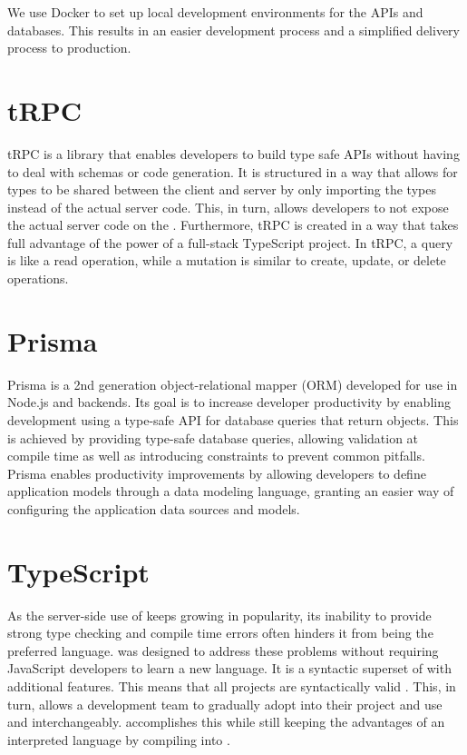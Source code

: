 We use Docker to set up local development environments for the APIs and databases. This results in an easier development process and a simplified delivery process to production.

\section{tRPC}
tRPC is a library that enables developers to build type safe APIs without having to deal with schemas or code generation.
It is structured in a way that allows for types to be shared between the client and server by only importing the types instead of the actual server code.
This, in turn, allows developers to not expose the actual server code on the \frontend{}.
Furthermore, tRPC is created in a way that takes full advantage of the power of a full-stack TypeScript project\cite{tRPC}.
In tRPC, a query is like a read operation, while a mutation is similar to create, update, or delete operations.

\section{Prisma}
Prisma is a 2nd generation object-relational mapper (ORM) developed for use in Node.js and \typescript{} backends.
Its goal is to increase developer productivity by enabling development using a type-safe API for database queries that return \javascript{} objects.
This is achieved by providing type-safe database queries, allowing validation at compile time as well as introducing constraints to prevent common pitfalls\cite{Prisma_Why}.
Prisma enables productivity improvements by allowing developers to define application models through a data modeling language, granting an easier way of configuring the application data sources and models\cite{Prisma_Doc}.

\section{TypeScript}
As the server-side use of \javascript{} keeps growing in popularity, its inability to provide strong type checking and compile time errors often hinders it from being the preferred language.
\typescript{} was designed to address these problems without requiring JavaScript developers to learn a new language.
It is a syntactic superset of \javascript{} with additional features.
This means that all \javascript{} projects are syntactically valid \typescript{}. This, in turn, allows a development team to gradually adopt \typescript{} into their project and use \typescript{} and \javascript{} interchangeably\cite{TypeScript}.
\typescript{} accomplishes this while still keeping the advantages of an interpreted language by compiling into \javascript{}.

